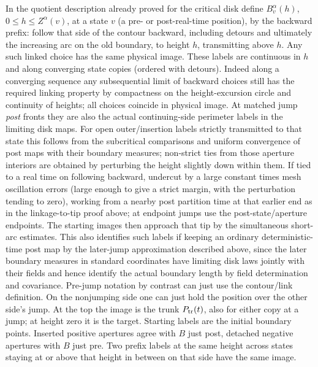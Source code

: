 \label{cut:prefix-labels}

In the quotient description already proved for the critical disk define
\(B^\alpha_v(h)\), \(0\le h\le Z^\alpha(v)\), at a state \(v\) (a pre- or post-real-time position), by the backward prefix: follow that side of the contour backward, including detours and ultimately the increasing arc on the old boundary, to height \(h\), transmitting above \(h\).
Any such linked choice has the same physical image.
These labels are continuous in \(h\) and along converging state copies (ordered with detours).
Indeed along a converging sequence any subsequential limit of backward choices still has the required linking property by compactness on the height-excursion circle and continuity of heights; all choices coincide in physical image.
At matched jump \emph{post} fronts they are also the actual continuing-side perimeter labels in the limiting disk maps.
For open outer/insertion labels strictly transmitted to that state this follows from the subcritical comparisons and uniform convergence of post maps with their boundary measures; non-strict ties from those aperture interiors are obtained by perturbing the height slightly down within them.
If tied to a real time on following backward, undercut by a large constant times mesh oscillation errors (large enough to give a strict margin, with the perturbation tending to zero), working from a nearby post partition time at that earlier end as in the linkage-to-tip proof above; at endpoint jumps use the post-state/aperture endpoints.
The starting images then approach that tip by the simultaneous short-arc estimates.
This also identifies such labels if keeping an ordinary deterministic-time post map by the later-jump approximation described above, since the later boundary measures in standard coordinates have limiting disk laws jointly with their fields and hence identify the actual boundary length by field determination and covariance.
Pre-jump notation by contrast can just use the contour/link definition.
On the nonjumping side one can just hold the position over the other side's jump.
At the top the image is the trunk \(P_{\rm tr}(t)\), also for either copy at a jump; at height zero it is the target.
Starting labels are the initial boundary points.
Inserted positive apertures agree with \(B\) just post, detached negative apertures with \(B\) just pre.
Two prefix labels at the same height across states staying at or above that height in between on that side have the same image.

